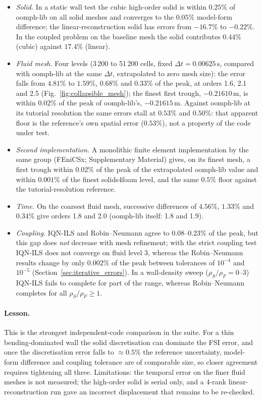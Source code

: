 \begin{itemize}
	\item \emph{Solid.} In a static wall test the cubic high-order solid is within $0.25\%$ of oomph-lib on all solid meshes and converges to the $0.05\%$ model-form difference; the linear-reconstruction solid has errors from $-16.7\%$ to $-0.22\%$. In the coupled problem on the baseline mesh the solid contributes $0.44\%$ (cubic) against $17.4\%$ (linear).
	\item \emph{Fluid mesh.} Four levels (3\,200 to 51\,200 cells, fixed $\Delta t = 0.00625\,\mathrm{s}$, compared with oomph-lib at the same $\Delta t$, extrapolated to zero mesh size): the error falls from $4.81\%$ to $1.59\%$, $0.68\%$ and $0.33\%$ of the peak, at orders 1.6, 2.1 and 2.5 (Fig.~\ref{fig:collapsible_mesh}); the finest first trough, $-0.21610\,\mathrm{m}$, is within $0.02\%$ of the peak of oomph-lib's, $-0.21615\,\mathrm{m}$. Against oomph-lib at its tutorial resolution the same errors stall at $0.53\%$ and $0.50\%$: that apparent floor is the reference's own spatial error ($0.53\%$), not a property of the code under test.
	\item \emph{Second implementation.} A monolithic finite element implementation by the same group (FEniCSx; Supplementary Material) gives, on its finest mesh, a first trough within $0.02\%$ of the peak of the extrapolated oomph-lib value and within $0.001\%$ of the finest solids4foam level, and the same $0.5\%$ floor against the tutorial-resolution reference.
	\item \emph{Time.} On the coarsest fluid mesh, successive differences of $4.56\%$, $1.33\%$ and $0.34\%$ give orders 1.8 and 2.0 (oomph-lib itself: 1.8 and 1.9).
	\item \emph{Coupling.} IQN-ILS and Robin--Neumann agree to $0.08$--$0.23\%$ of the peak, but this gap does \emph{not} decrease with mesh refinement; with the strict coupling test IQN-ILS does not converge on fluid level 3, whereas the Robin--Neumann results change by only $0.002\%$ of the peak between tolerances of $10^{-4}$ and $10^{-5}$ (Section~\ref{sec:iterative_errors}). In a wall-density sweep ($\rho_S/\rho_F = 0$--3) IQN-ILS fails to complete for part of the range, whereas Robin--Neumann completes for all $\rho_S/\rho_F \geq 1$.
\end{itemize}

\paragraph{Lesson.}
This is the strongest independent-code comparison in the suite.
For a thin bending-dominated wall the solid discretisation can dominate the FSI error, and once the discretisation error falls to $\approx0.5\%$ the reference uncertainty, model-form difference and coupling tolerance are of comparable size, so closer agreement requires tightening all three.
Limitations: the temporal error on the finer fluid meshes is not measured; the high-order solid is serial only, and a 4-rank linear-reconstruction run gave an incorrect displacement that remains to be re-checked.


